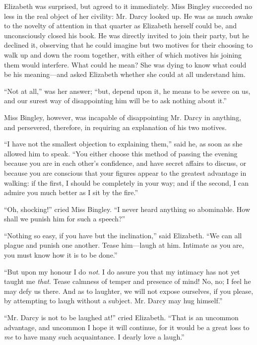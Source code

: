 \documentclass[12pt]{book}
\begin{document}
Elizabeth was surprised, but agreed to it immediately. Miss Bingley succeeded no less in the real object of her civility: Mr. Darcy looked up. He was as much awake to the novelty of attention in that quarter as Elizabeth herself could be, and unconsciously closed his book. He was directly invited to join their party, but he declined it, observing that he could imagine but two motives for their choosing to walk up and down the room together, with either of which motives his joining them would interfere. What could he mean? She was dying to know what could be his meaning---and asked Elizabeth whether she could at all understand him.

``Not at all,'' was her answer; ``but, depend upon it, he means to be severe on us, and our surest way of disappointing him will be to ask nothing about it.''

Miss Bingley, however, was incapable of disappointing Mr. Darcy in anything, and persevered, therefore, in requiring an explanation of his two motives.

``I have not the smallest objection to explaining them,'' said he, as soon as she allowed him to speak. ``You either choose this method of passing the evening because you are in each other's confidence, and have secret affairs to discuss, or because you are conscious that your figures appear to the greatest advantage in walking: if the first, I should be completely in your way; and if the second, I can admire you much better as I sit by the fire.''

``Oh, shocking!'' cried Miss Bingley. ``I never heard anything so abominable. How shall we punish him for such a speech?''

``Nothing so easy, if you have but the inclination,'' said Elizabeth. ``We can all plague and punish one another. Tease him---laugh at him. Intimate as you are, you must know how it is to be done.''

``But upon my honour I do \textit{not}. I do assure you that my intimacy has not yet taught me \textit{that}. Tease calmness of temper and presence of mind! No, no; I feel he may defy us there. And as to laughter, we will not expose ourselves, if you please, by attempting to laugh without a subject. Mr. Darcy may hug himself.''

``Mr. Darcy is not to be laughed at!'' cried Elizabeth. ``That is an uncommon advantage, and uncommon I hope it will continue, for it would be a great loss to \textit{me} to have many such acquaintance. I dearly love a laugh.''
\end{document}
